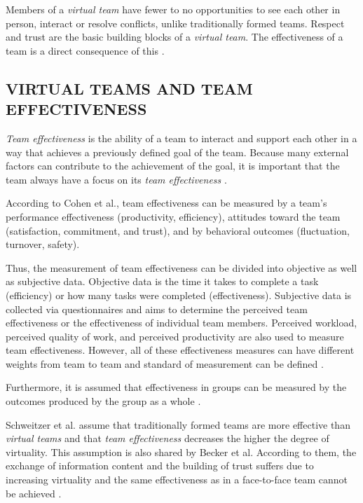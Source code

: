 \documentclass[sigchi]{acmart}
\begin{document}
Members of a \textit{virtual team} have fewer to no opportunities to see each other in person, interact or resolve conflicts, unlike traditionally formed teams. Respect and trust are the basic building blocks of a \textit{virtual team}. The effectiveness of a team is a direct consequence of this \citep[p. 378]{ren2007applying}.

\subsection{VIRTUAL TEAMS AND TEAM EFFECTIVENESS}
\textit{Team effectiveness} is the ability of a team to interact and support each other in a way that achieves a previously defined goal of the team. Because many external factors can contribute to the achievement of the goal, it is important that the team always have a focus on its \textit{team effectiveness} \citep[p. 557]{salas2005there}.

According to Cohen et al.\citep[243-245]{cohen1997makes}, team effectiveness can be measured by a team's performance effectiveness (productivity, efficiency), attitudes toward the team (satisfaction, commitment, and trust), and by behavioral outcomes (fluctuation, turnover, safety). 

Thus, the measurement of team effectiveness can be divided into objective as well as subjective data. Objective data is the time it takes to complete a task (efficiency) or how many tasks were completed (effectiveness). Subjective data is collected via questionnaires and aims to determine the perceived team effectiveness or the effectiveness of individual team members. Perceived workload, perceived quality of work, and perceived productivity are also used to measure team effectiveness. However, all of these effectiveness measures can have different weights from team to team and standard of measurement can be defined \citep[9]{pina2008teams}. 

Furthermore, it is assumed that effectiveness in groups can be measured by the outcomes produced by the group as a whole \citep[p. 309]{guzzo1996teams}. 

Schweitzer et al. \citep{schweitzer2010conceptualizing} assume that traditionally formed teams are more effective than \textit{virtual teams} and that \textit{team effectiveness} decreases the higher the degree of virtuality.
This assumption is also shared by Becker et al. According to them, the exchange of information content and the building of trust suffers due to increasing virtuality and the same effectiveness as in a face-to-face team cannot be achieved \citep{handke2019alles}.
\end{document}

